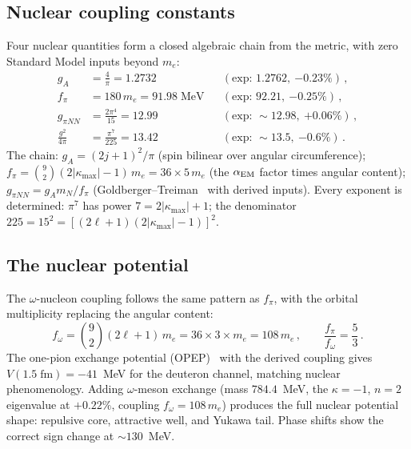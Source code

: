 \documentclass[aps,prd,twocolumn,superscriptaddress,nofootinbib,longbibliography]{revtex4-2}
\newcommand{\kmax}{|\kappa_{\mathrm{max}}|}
\begin{document}
\subsection{Nuclear coupling constants}

Four nuclear quantities form a closed algebraic chain from the
metric, with zero Standard Model inputs beyond $m_e$:
\begin{align}
  g_A &= \frac{4}{\pi} = 1.2732
    &&(\text{exp: }1.2762,\ {-0.23\%})\,,
    \label{eq:gA}\\
  f_\pi &= 180\,m_e = 91.98\;\text{MeV}
    &&(\text{exp: }92.21,\ {-0.25\%})\,,
    \label{eq:fpi}\\
  g_{\pi NN} &= \frac{2\pi^4}{15} = 12.99
    &&(\text{exp: }{\sim}12.98,\ {+0.06\%})\,,
    \label{eq:gpiNN}\\
  \frac{g^2}{4\pi} &= \frac{\pi^7}{225} = 13.42
    &&(\text{exp: }{\sim}13.5,\ {-0.6\%})\,.
    \label{eq:g2}
\end{align}
The chain: $g_A = (2j+1)^2/\pi$ (spin bilinear over angular
circumference); $f_\pi = \binom{9}{2}(2\kmax - 1)\,m_e = 36 \times
5\,m_e$ (the $\alpha_{\rm EM}$ factor times angular content);
$g_{\pi NN} = g_A m_N/f_\pi$ (Goldberger--Treiman~\cite{Goldberger1958} with derived
inputs).  Every exponent is determined: $\pi^7$ has power
$7 = 2\kmax + 1$; the denominator $225 = 15^2 =
[(2\ell+1)(2\kmax-1)]^2$.

\subsection{The nuclear potential}

The $\omega$-nucleon coupling follows the same pattern as $f_\pi$,
with the orbital multiplicity replacing the angular content:
\begin{equation}
  f_\omega = \binom{9}{2}(2\ell+1)\,m_e = 36 \times 3 \times m_e
  = 108\,m_e\,,
  \qquad \frac{f_\pi}{f_\omega} = \frac{5}{3}\,.
\end{equation}
The one-pion exchange potential (OPEP)~\cite{Machleidt2001,Epelbaum2009} with the derived coupling gives
$V(1.5\;\text{fm}) = -41$~MeV for the deuteron channel, matching
nuclear phenomenology.  Adding $\omega$-meson exchange (mass
$784.4$~MeV, the $\kappa = -1$, $n = 2$ eigenvalue at $+0.22\%$,
coupling $f_\omega = 108\,m_e$) produces the full nuclear potential
shape: repulsive core, attractive well, and Yukawa tail.  Phase
shifts show the correct sign change at $\sim\!130$~MeV.
\end{document}
